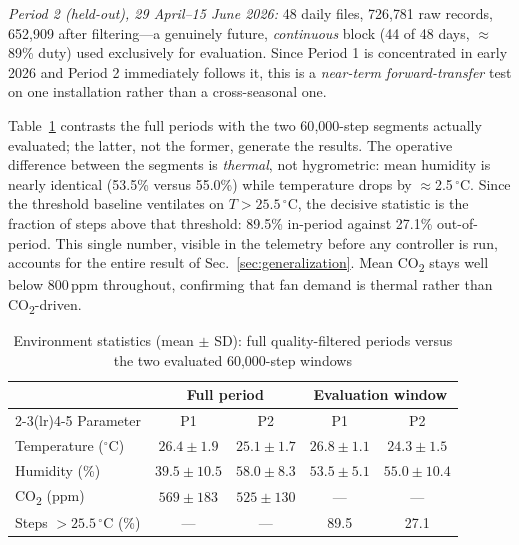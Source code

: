 \documentclass[conference]{IEEEtran}
\begin{document}
\emph{Period 2 (held-out), 29 April--15 June 2026:} 48 daily files, 726{,}781 raw
records, 652{,}909 after filtering---a genuinely future, \emph{continuous} block
(44 of 48 days, $\approx$89\% duty) used exclusively for evaluation. Since
Period 1 is concentrated in early 2026 and Period 2 immediately follows it, this
is a \emph{near-term forward-transfer} test on one installation rather than a
cross-seasonal one.

Table~\ref{tab:env} contrasts the full periods with the two 60{,}000-step
segments actually evaluated; the latter, not the former, generate the results.
The operative difference between the segments is \emph{thermal}, not
hygrometric: mean humidity is nearly identical (53.5\% versus 55.0\%) while
temperature drops by $\approx$2.5\,$^{\circ}$C. Since the threshold baseline
ventilates on $T>25.5\,^{\circ}$C, the decisive statistic is the fraction of
steps above that threshold: 89.5\% in-period against 27.1\% out-of-period. This
single number, visible in the telemetry before any controller is run, accounts
for the entire result of Sec.~\ref{sec:generalization}. Mean
CO\textsubscript{2} stays well below 800\,ppm throughout, confirming that fan
demand is thermal rather than CO\textsubscript{2}-driven.

\begin{table}[t]
\caption{Environment statistics (mean $\pm$ SD): full quality-filtered periods
versus the two evaluated 60{,}000-step windows}
\label{tab:env}
\centering
\footnotesize
\setlength{\tabcolsep}{3pt}
\begin{tabular}{lcccc}
\toprule
 & \multicolumn{2}{c}{Full period} & \multicolumn{2}{c}{Evaluation window} \\
\cmidrule(lr){2-3}\cmidrule(lr){4-5}
Parameter & P1 & P2 & P1 & P2 \\
\midrule
Temperature ($^{\circ}$C)  & $26.4\pm1.9$ & $25.1\pm1.7$ & $26.8\pm1.1$ & $24.3\pm1.5$ \\
Humidity (\%)              & $39.5\pm10.5$ & $58.0\pm8.3$ & $53.5\pm5.1$ & $55.0\pm10.4$ \\
CO\textsubscript{2} (ppm)  & $569\pm183$ & $525\pm130$ & --- & --- \\
Steps $>25.5\,^{\circ}$C (\%) & --- & --- & 89.5 & 27.1 \\
\bottomrule
\end{tabular}
\end{table}
\end{document}

